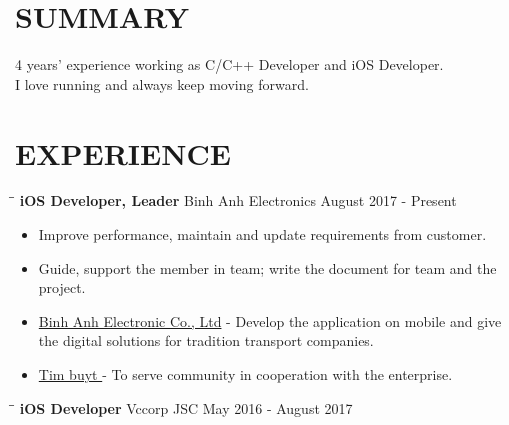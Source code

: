 \documentclass[margin, 10pt]{res}
\begin{document}
\begin{resume}
 
\section{SUMMARY}
   4 years' experience working as C/C++ Developer and iOS Developer.\\I love running and always keep moving forward.
 
\section{EXPERIENCE}
   \vspace{-0.1in}

   \begin{tabbing}
   \hspace{2.0in}\= \hspace{2.0in}\= \kill %
   {\bf iOS Developer, Leader} \>Binh Anh Electronics \>August 2017 - Present\\
   \end{tabbing}\vspace{-20pt} %

   \begin{itemize}
		\item Improve performance, maintain and update requirements from customer. 
		\item Guide, support the member in team; write the document for team and the project.
		\item {\color{blue}\href{https://itunes.apple.com/vn/developer/binh-anh-electronic-co-ltd/id1020602455?l=vi&mt=8}{Binh Anh Electronic Co., Ltd}} - Develop the application on mobile and give the digital solutions for tradition transport companies.
		\item {\color{blue}\href{https://itunes.apple.com/app/id947703352}{ Tim buyt }} - To serve community in cooperation with the enterprise.
   \end{itemize}

   \begin{tabbing}
   \hspace{2.0in}\= \hspace{2.0in}\= \kill %
   {\bf iOS Developer} \>Vccorp JSC \>May 2016 - August 2017\\
   \end{tabbing}\vspace{-20pt} %


\end{resume}
\end{document}

